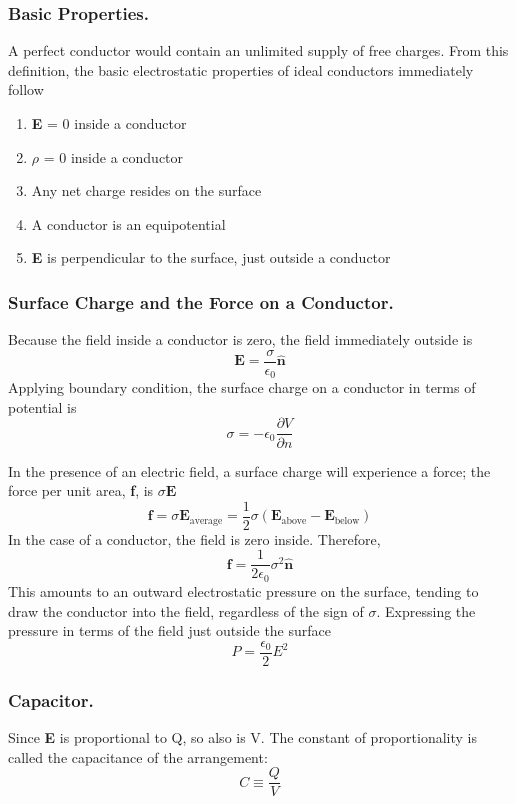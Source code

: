 \documentclass[../../../main.tex]{subfiles}
\begin{document}
\subsubsection{Basic Properties.}
A perfect conductor would contain an unlimited supply of free charges. From this definition, the basic electrostatic properties of ideal conductors immediately follow
\begin{enumerate}
    \item \textbf{E} = 0 inside a conductor
    \item $\rho$ = 0 inside a conductor
    \item Any net charge resides on the surface
    \item A conductor is an equipotential
    \item \textbf{E} is perpendicular to the surface, just outside a conductor
\end{enumerate}

\subsubsection{Surface Charge and the Force on a Conductor.}
Because the field inside a conductor is zero,
the field immediately outside is
\begin{equation*}
    \mathbf{E}=\frac{\sigma}{\epsilon_0}\mathbf{\hat{n}}
\end{equation*}
Applying boundary condition, the surface charge on a conductor in
terms of potential is
\begin{equation*}
    \sigma=-\epsilon_0\frac{\partial V}{\partial n}
\end{equation*}

In the presence of an electric field, a surface charge will experience a force; the force per unit area, \textbf{f}, is $\sigma\mathbf{E}$
\begin{equation*}
    \mathbf{f}=\sigma\mathbf{E}_{\text{average}}=\frac{1}{2}\sigma(\mathbf{E}_{\text{above}}-\mathbf{E}_{\text{below}})
\end{equation*}
In the case of a conductor, the field is zero inside. Therefore,
\begin{equation*}
    \mathbf{f}=\frac{1}{2\epsilon_0}\sigma^2\mathbf{\hat{n}}
\end{equation*}
This amounts to an outward electrostatic pressure on the surface, tending to draw the conductor into the field, regardless of the sign of $\sigma$. Expressing the pressure in terms of the field just outside the surface
\begin{equation*}
    P=\frac{\epsilon_0}{2}E^2
\end{equation*}

\subsubsection{Capacitor.}
Since \textbf{E} is proportional to Q, so also is V. The constant of proportionality is called the capacitance of the arrangement:
\begin{equation*}
    C\equiv \frac{Q}{V}
\end{equation*}
\end{document}
